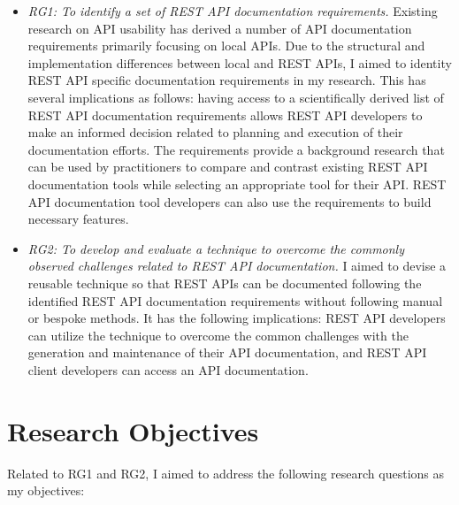 \begin{itemize}
  \item \textit{RG1: To identify a set of REST API documentation requirements.} Existing research on API usability has derived a number of API documentation requirements primarily focusing on local APIs. Due to the structural and implementation differences between local and REST APIs, I aimed to identity REST API specific documentation requirements in my research. This has several implications as follows: having access to a scientifically derived list of REST API documentation requirements allows REST API developers to make an informed decision related to planning and execution of their documentation efforts. The requirements provide a background research that can be used by practitioners to compare and contrast existing REST API documentation tools while selecting an appropriate tool for their API. REST API documentation tool developers can also use the requirements to build necessary features.
  \item \textit{RG2: To develop and evaluate a technique to overcome the commonly observed challenges related to REST API documentation.} I aimed to devise a reusable technique so that REST APIs can be documented following the identified REST API documentation requirements without following manual or bespoke methods. It has the following implications: REST API developers can utilize the technique to overcome the common challenges with the generation and maintenance of their API documentation, and REST API client developers can access an API documentation.
\end{itemize}


\section{Research Objectives}
Related to RG1 and RG2, I aimed to address the following research questions as my objectives:

